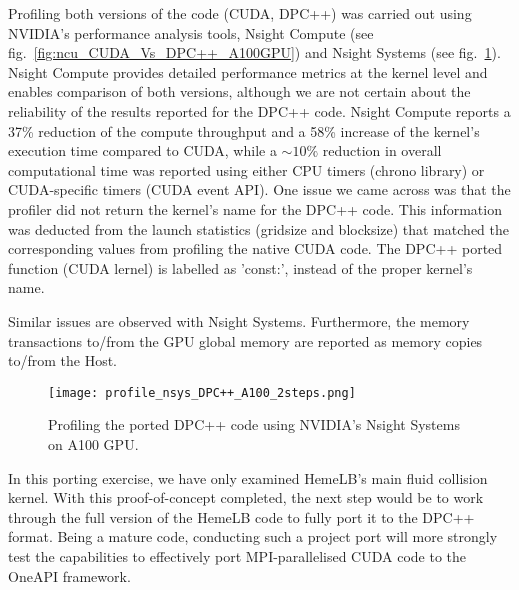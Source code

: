 Profiling both versions of the code (CUDA, DPC++) was carried out using NVIDIA's performance analysis tools, Nsight Compute (see fig.~\ref{fig:ncu_CUDA_Vs_DPC++_A100GPU}) and Nsight Systems (see fig.~\ref{fig:nsys_DPC++_A100GPU}). Nsight Compute provides detailed performance metrics at the kernel level and enables comparison of both versions, although we are not certain about the reliability of the results reported for the DPC++ code. Nsight Compute reports a 37\% reduction of the compute throughput and a 58\% increase of the kernel's execution time compared to CUDA, while a $\sim10\%$ reduction in overall computational time was reported using either CPU timers (chrono library) or CUDA-specific timers (CUDA event API).
One issue we came across was that the profiler did not return the kernel's name for the DPC++ code. This information was deducted from the launch statistics (gridsize and blocksize) that matched the corresponding values from profiling the native CUDA code. The DPC++ ported function (CUDA lernel) is labelled as 'const:', instead of the proper kernel's name.


Similar issues are observed with Nsight Systems. Furthermore, the memory transactions to/from the GPU global memory are reported as memory copies to/from the Host.


\begin{figure}[htp]
	\centering
	\texttt{[image: profile\_nsys\_DPC++\_A100\_2steps.png]}
	\caption{Profiling the ported DPC++ code using NVIDIA's Nsight Systems on A100 GPU.}
	\label{fig:nsys_DPC++_A100GPU}
\end{figure}

In this porting exercise, we have only examined HemeLB's main fluid collision kernel. With this proof-of-concept completed, the next step would be to work through the full version of the HemeLB code to fully port it to the DPC++ format. Being a mature code, conducting such a project port will more strongly test the capabilities to effectively port MPI-parallelised CUDA code to the OneAPI framework.

